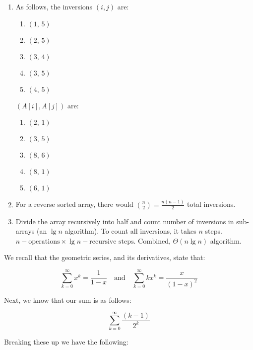 \documentclass[12pt]{scrartcl}
\begin{document}
\problem{}
\begin{enumerate}
    \item As follows, the inversions $(i, j)$ are:
        \begin{enumerate}
            \item $(1,\, 5)$
            \item $(2,\, 5)$
            \item $(3,\, 4)$
            \item $(3,\, 5)$
            \item $(4,\, 5)$
        \end{enumerate}

        $(A[i], A[j])$ are:

        \begin{enumerate}
            \item $(2,\, 1)$
            \item $(3,\, 5)$
            \item $(8,\, 6)$
            \item $(8,\, 1)$
            \item $(6,\, 1)$
        \end{enumerate}

    \item For a reverse sorted array, there would ${n \choose 2} = \frac{n(n - 1)}{2}$ total inversions.

    \item Divide the array recursively into half and count number of inversions in sub-arrays (an $\lg n$ algorithm). To count all inversions, it takes $n$ steps. $n-\text{operations}\times \lg n-\text{recursive steps}$. Combined, $\Theta\left( n \lg n \right)$ algorithm.
\end{enumerate}

\problem{}
We recall that the geometric series, and its derivatives, state that:

\begin{equation}\label{eq:identity}
    \sum_{k = 0} ^\infty x^k = \frac{1}{1 - x}
    \quad\text{and}\quad
    \sum_{k = 0} ^\infty k x^k = \frac{x}{{\left(1 - x\right)}^2}
\end{equation}

Next, we know that our sum is as follows:

\begin{equation*}
    \sum_{k = 0} ^\infty \frac{(k - 1)}{2^k}
\end{equation*}

Breaking these up we have the following:
\end{document}
